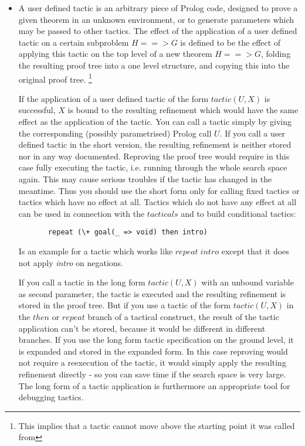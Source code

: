 \documentclass[11pt]{report}
\makeatletter
\newcommand{\inv}[1]{\index{#1}}
\newcommand{\ulinv}[1]{\index{#1@\texttt{#1}}}
\makeatother
\begin{document}
\begin{itemize}
\begin{sf}
\begin{tabbing}
\end{tabbing}\end{sf}

  
 \item
 \inv{user tactic} \ulinv{tactic}
 A user defined tactic is an arbitrary piece of Prolog code,
 designed to prove a given theorem in an unknown environment,
 or to generate parameters which may be passed to other tactics.
 The effect of the application of a user defined tactic 
 on a certain subproblem $H==>G$ is defined to
 be the effect of applying this tactic on the top level
 of a new theorem $H==>G$, folding the resulting proof tree
 into a one level structure, and copying this into the
 original proof tree. 
 \footnote{This implies that a tactic cannot move above the
 starting point it was called from}
 
 \ulinv{tactic}
 If the application of a user defined tactic of the form
 $tactic(U,X)$ is successful, $X$ is bound to the resulting refinement
 which would have the same effect as the application of the tactic.
 You can call a tactic simply by giving the corresponding
 (possibly parametrised) Prolog call $U$.
 If you call a user defined tactic in the short version,
 the resulting refinement is neither stored nor in any
 way documented. Reproving the proof tree would require in
 this case fully executing the tactic, i.e. running through
 the whole search space again. This may cause serious troubles
 if the tactic has changed in the meantime. Thus you should
 use the short form only for calling fixed tactics or tactics
 which have no effect at all.
 Tactics which do not have any effect at all
 can be used in connection with the $tacticals$ and to build
 conditional tactics: 
 \begin{verbatim}
       repeat (\+ goal(_ => void) then intro)
 \end{verbatim}
 Is an example for a tactic which works like $repeat\; intro$
 except that it does not apply \emph{intro} on negations.
       
 If you call a tactic in the
 long form $tactic(U,X)$ with an unbound variable as second
 parameter, the tactic is executed and the resulting refinement
 is stored in the proof tree. But if you use a tactic of the
 form $tactic(U,X)$ in the $then$ or $repeat$ branch of a
 tactical construct, the result of the tactic application can't
 be stored, because it would be different in different branches. 
 If you use the long form tactic specification on the ground
 level, it is expanded and stored in the expanded form.
 In this case reproving would
 not require a reexecution of the tactic, it would simply
 apply the resulting refinement directly - so you can save
 time if the search space is very large.
 The long form of a tactic application is furthermore
 an appropriate tool for debugging tactics.
  

\end{itemize}
\end{document}
